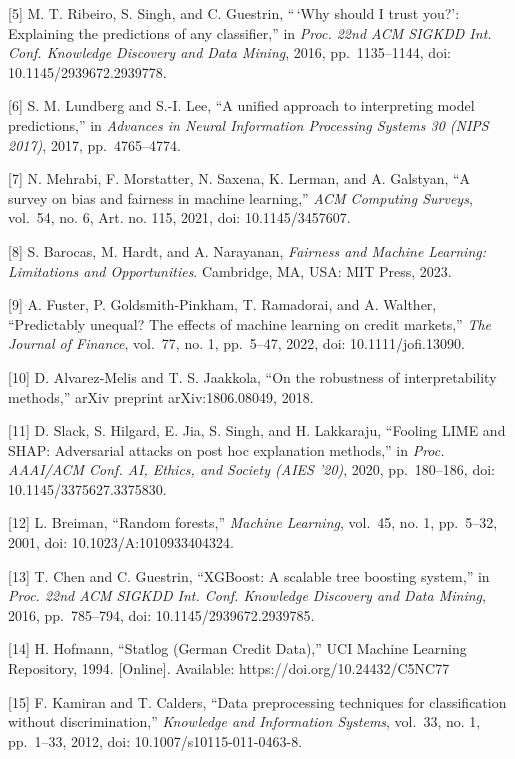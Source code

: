 \documentclass[
  11pt,
]{article}
\begin{document}
{[}5{]} M. T. Ribeiro, S. Singh, and C. Guestrin, ``\,`Why should I
trust you?': Explaining the predictions of any classifier,'' in
\emph{Proc. 22nd ACM SIGKDD Int. Conf. Knowledge Discovery and Data
Mining}, 2016, pp.~1135--1144, doi: 10.1145/2939672.2939778.

{[}6{]} S. M. Lundberg and S.-I. Lee, ``A unified approach to
interpreting model predictions,'' in \emph{Advances in Neural
Information Processing Systems 30 (NIPS 2017)}, 2017, pp.~4765--4774.

{[}7{]} N. Mehrabi, F. Morstatter, N. Saxena, K. Lerman, and A.
Galstyan, ``A survey on bias and fairness in machine learning,''
\emph{ACM Computing Surveys}, vol.~54, no. 6, Art. no. 115, 2021, doi:
10.1145/3457607.

{[}8{]} S. Barocas, M. Hardt, and A. Narayanan, \emph{Fairness and
Machine Learning: Limitations and Opportunities}. Cambridge, MA, USA:
MIT Press, 2023.

{[}9{]} A. Fuster, P. Goldsmith-Pinkham, T. Ramadorai, and A. Walther,
``Predictably unequal? The effects of machine learning on credit
markets,'' \emph{The Journal of Finance}, vol.~77, no. 1, pp.~5--47,
2022, doi: 10.1111/jofi.13090.

{[}10{]} D. Alvarez-Melis and T. S. Jaakkola, ``On the robustness of
interpretability methods,'' arXiv preprint arXiv:1806.08049, 2018.

{[}11{]} D. Slack, S. Hilgard, E. Jia, S. Singh, and H. Lakkaraju,
``Fooling LIME and SHAP: Adversarial attacks on post hoc explanation
methods,'' in \emph{Proc. AAAI/ACM Conf. AI, Ethics, and Society (AIES
'20)}, 2020, pp.~180--186, doi: 10.1145/3375627.3375830.

{[}12{]} L. Breiman, ``Random forests,'' \emph{Machine Learning},
vol.~45, no. 1, pp.~5--32, 2001, doi: 10.1023/A:1010933404324.

{[}13{]} T. Chen and C. Guestrin, ``XGBoost: A scalable tree boosting
system,'' in \emph{Proc. 22nd ACM SIGKDD Int. Conf. Knowledge Discovery
and Data Mining}, 2016, pp.~785--794, doi: 10.1145/2939672.2939785.

{[}14{]} H. Hofmann, ``Statlog (German Credit Data),'' UCI Machine
Learning Repository, 1994. {[}Online{]}. Available:
https://doi.org/10.24432/C5NC77

{[}15{]} F. Kamiran and T. Calders, ``Data preprocessing techniques for
classification without discrimination,'' \emph{Knowledge and Information
Systems}, vol.~33, no. 1, pp.~1--33, 2012, doi:
10.1007/s10115-011-0463-8.
\end{document}
